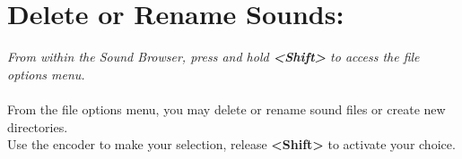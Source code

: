 \section{Delete or Rename Sounds:}
\textit{From within the Sound Browser, press and hold \textbf{<Shift>} to access the file options menu.}\\\\
From the file options menu, you may delete or rename sound files or create new directories.\\
Use the encoder to make your selection, release \textbf{<Shift>} to activate your choice.
